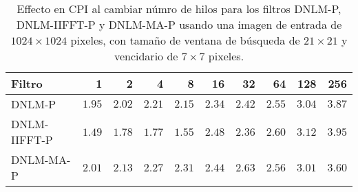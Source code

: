   
  
\begin{table}
\protect\caption[Comportamiento del CPI al aumentar numero de hilos]{Effecto en CPI al cambiar númro de hilos para los filtros DNLM-P, DNLM-IIFFT-P y DNLM-MA-P usando una imagen de entrada de  $1024 \times 1024$ pixeles, con tama\~no de ventana de búsqueda de $21 \times 21$ y vencidario de $7 \times 7$ pixeles. \label{tabla:scala1}}
\centering
\begin{tabular}{lrrrrrrrrr}
Filtro & 1& 2& 4& 8& 16&32& 64 &128& 256\tabularnewline
\hline
DNLM-P& $1.95$ & $2.02$ & $2.21$ &  $2.15$ &  $2.34$ & $2.42$  & $2.55$  & $3.04 $ & $3.87$ \tabularnewline
DNLM-IIFFT-P &$1.49$ & $1.78$ & $1.77$ &  $1.55$ &  $2.48$ & $2.36$  & $2.60$  & $3.12$  & $3.95$ \tabularnewline
DNLM-MA-P & $2.01$ & $2.13$ & $2.27$ &  $2.31$ &  $ 2.44$ & $2.63$  & $2.56$  & $3.01$  & $3.60$ \tabularnewline
\end{tabular}
\end{table}